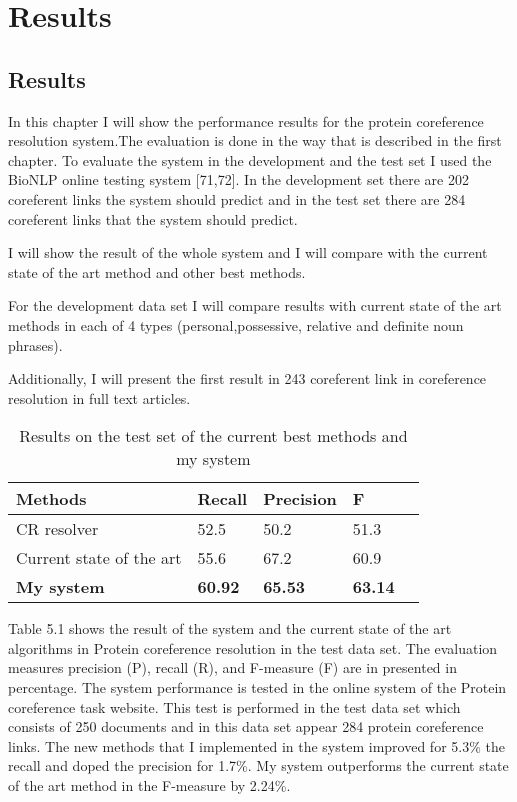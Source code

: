 \chapter{Results}
\label{Results}
\section{Results}

In this chapter I will show the performance results for the protein coreference resolution system.The evaluation is done in the way that is described in the first chapter. To evaluate the system in the development and the test set I used the BioNLP online testing system [71,72]. In the development set there are 202 coreferent links the system should predict and in the test set there are 284 coreferent links that the system should predict.  

I will show the result of the whole system and I will compare with the current state of the art method and other best methods.

For the development data set I will compare results with current state of the art methods in each of 4 types (personal,possessive, relative and definite noun phrases). 

Additionally, I will present the first result in 243 coreferent link in coreference resolution in full text articles.

\begin{table}[h]
\centering
   \begin{center}
	 \begin{tabular}{l | C{1.7cm} C{2cm} C{1.7cm} @{}m{0pt}@{}}
 		
  		Methods & Recall & Precision & F &  \\[1.1ex]
 		\hline
 		CR resolver & 52.5 & 50.2 & 51.3&  \\ [1.1ex]
 		\hline 
 		Current state of the art & 55.6 & 67.2 & 60.9 & \\ [1.1ex]
 		\hline   
 		\textbf{My system} & \textbf{60.92} & \textbf{65.53} & \textbf{63.14}& \\ [1.1ex]
 		\hline  
 	\end{tabular}
  \end{center} 
  \caption{ Results on the test set of the current best methods and my system }
\end{table}
Table 5.1 shows the result of the system and the current state of the art algorithms in Protein coreference resolution in the test data set. The evaluation measures precision (P), recall (R), and F-measure (F)  are in presented in percentage. The system performance is tested in the online system of the Protein coreference task website. This test is performed in the test data set which consists of 250 documents and in this data set appear 284 protein coreference links. The new methods that I implemented in the system improved for 5.3\% the recall and doped the precision for 1.7\%. My system outperforms the current state of the art  method in the F-measure by 2.24\%.

